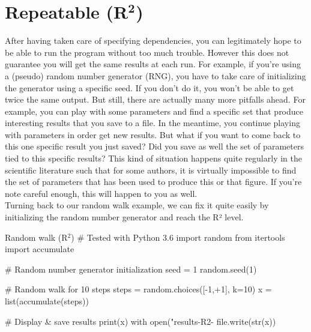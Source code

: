\documentclass[a4paper,11pt]{article}
\begin{document}
\clearpage
\section*{Repeatable (R$^{\mathbf 2}$)}

After having taken care of specifying dependencies, you can legitimately hope to be able to run the program without too much trouble.
However this does not guarantee you will get the same results at each run.
For example, if you're using a (pseudo) random number generator (RNG), you have to take care of initializing the generator using a specific seed.
If you don't do it, you won't be able to get twice the same output.
But still, there are actually many more pitfalls ahead.
For example, you can play with some parameters and find a specific set that produce interesting results that you save to a file.
In the meantime, you continue playing with parameters in order get new results.
But what if you want to come back to this one specific result you just saved? Did you save as well the set of parameters tied to this specific results? 
This kind of situation happens quite regularly in the scientific literature \cite{Claerbout:2000} such that for some authors, it is virtually impossible to find the set of parameters that has been used to produce this or that figure.
If you're note careful enough, this will happen to you as well.\\

Turning back to our random walk example, we can fix it quite easily by initializing the random number generator and reach the R² level.

\begin{code}{Random walk (R$^2$)}
# Tested with Python 3.6
import random
from itertools import accumulate

# Random number generator initialization
seed = 1
random.seed(1)

# Random walk for 10 steps
steps = random.choices([-1,+1], k=10)
x = list(accumulate(steps))

# Display & save results
print(x)
with open("results-R2-%
    file.write(str(x))
\end{code}


\clearpage
\end{document}
